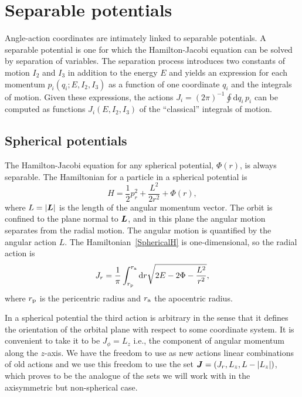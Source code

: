 \documentclass[useAMS,usenatbib,fleqn,a4paper]{mn2e}
\def\ra{r_{\rm a}}
\def\rp{r_{\rm p}}
\def\half{{\textstyle{\frac12}}}
\newcommand{\bs}[1]{\bmath{#1}}
\begin{document}
\section{Separable potentials}\label{Sect::Separable}

Angle-action coordinates are intimately linked to separable potentials. A
separable potential is one for which the Hamilton-Jacobi equation can be
solved by separation of variables. The separation process introduces two
constants of motion $I_2$ and $I_3$ in addition to the energy $E$ and yields an
expression for each momentum $p_i(q_i;E,I_2,I_3)$ as a function of one
coordinate $q_i$ and the integrals of motion. Given these expressions, the
actions $J_i=(2\pi)^{-1}\oint\mathrm{d} q_i\,p_i$ can be computed as
functions $J_i(E,I_2,I_3)$ of the ``classical'' integrals of motion.


\subsection{Spherical potentials}

The Hamilton-Jacobi equation for any spherical potential, $\Phi(r)$, is
always separable. The Hamiltonian for a particle in a spherical potential is
\begin{equation}
H = \half p_r^2 +\frac{L^2}{2r^2} + \Phi(r),
\label{SphericalH}
\end{equation}
 where $L=|\bs{L}|$ is the length of the angular momentum vector.  The orbit
is confined to the plane normal to $\bs{L}$, and in this plane the angular
motion separates from the radial motion. The angular motion is quantified by
the angular action $L$. The
Hamiltonian~\eqref{SphericalH} is one-dimensional, so the radial
action is
\begin{equation}\label{JrSphere}
J_r =
\frac{1}{\pi}\int_{\rp}^{\ra}\mathrm{d}r\sqrt{2E-2\Phi-\frac{L^2}{r^2}},
\end{equation}
where $\rp$ is the pericentric radius and $\ra$ the
apocentric radius. 

In a spherical potential the third action is  arbitrary in the sense that it
defines the orientation of the orbital plane with respect to some coordinate
system.  It is convenient to take it to be $J_\phi=L_z$ i.e., the component
of angular momentum along the $z$-axis. We have the freedom to use as new
actions linear combinations of old actions and we use this freedom to use the
set $\bs{J}=(J_r,L_z,L-|L_z|)$, which proves to be the analogue of the sets
we will work with in the  axisymmetric but non-spherical case.
\end{document}
